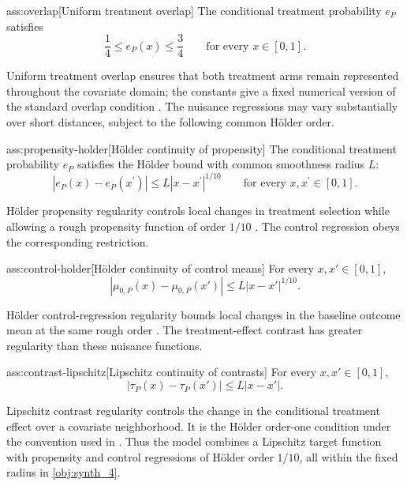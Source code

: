 \begin{assumptionv}{ass:overlap}[Uniform treatment overlap]
The conditional treatment probability \(e_P\) satisfies
\[
\frac14\le e_P(x)\le\frac34
\qquad\text{for every }x\in[0,1].
\]
\end{assumptionv}

Uniform treatment overlap ensures that both treatment arms remain represented throughout the covariate domain; the constants give a fixed numerical version of the standard overlap condition \citep{KennedyBalakrishnanRobinsWasserman2024}. The nuisance regressions may vary substantially over short distances, subject to the following common Hölder order.

\begin{assumptionv}{ass:propensity-holder}[Hölder continuity of propensity]
The conditional treatment probability \(e_P\) satisfies the Hölder bound with common smoothness radius \(L\):
\[
|e_P(x)-e_P(x^{\prime})|
\le L|x-x^{\prime}|^{1/10}
\qquad\text{for every }x,x^{\prime}\in[0,1].
\]
\end{assumptionv}

Hölder propensity regularity controls local changes in treatment selection while allowing a rough propensity function of order \(1/10\) \citep{KennedyBalakrishnanRobinsWasserman2024}. The control regression obeys the corresponding restriction.

\begin{assumptionv}{ass:control-holder}[Hölder continuity of control means]
For every \(x,x'\in[0,1]\),
\[
|\mu_{0,P}(x)-\mu_{0,P}(x')|
\le L|x-x'|^{1/10}.
\]
\end{assumptionv}

Hölder control-regression regularity bounds local changes in the baseline outcome mean at the same rough order \citep{KennedyBalakrishnanRobinsWasserman2024}. The treatment-effect contrast has greater regularity than these nuisance functions.

\begin{assumptionv}{ass:contrast-lipschitz}[Lipschitz continuity of contrasts]
For every \(x,x'\in[0,1]\),
\[
|\tau_P(x)-\tau_P(x')|
\le L|x-x'|.
\]
\end{assumptionv}

Lipschitz contrast regularity controls the change in the conditional treatment effect over a covariate neighborhood. It is the Hölder order-one condition under the convention used in \citep{KennedyBalakrishnanRobinsWasserman2024}. Thus the model combines a Lipschitz target function with propensity and control regressions of Hölder order \(1/10\), all within the fixed radius in \cref{obj:synth_4}.

